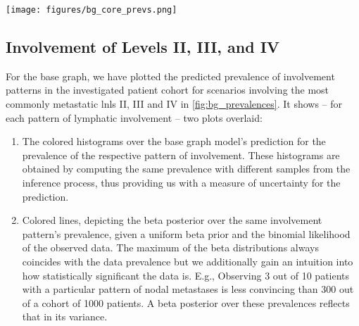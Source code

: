 \documentclass[twocolumn]{aastex631}
\begin{document}
\begin{figure*}
    \begin{centering}
        \texttt{[image: figures/bg\_core\_prevs.png]}
        \caption{Prevalence of involvement as predicted by the base graph model for different scenarios involving the most commonly metastatic \glspl{lnl} II, III and IV (shaded histograms). The model's predictions are compared to Beta posteriors over the prevalence based on the frequency of the same scenarios and a uniform prior (slid lines). The top panel shows some selected scenarios with early T-category tumors and the bottom panel with late T-category.}
        \label{fig:bg_prevalences}
    \end{centering}
\end{figure*}


\subsection{Involvement of Levels II, III, and IV}
\label{subsec:results:lnls_II_III_IV}

For the base graph, we have plotted the predicted prevalence of involvement patterns in the investigated patient cohort for scenarios involving the most commonly metastatic \glspl{lnl} II, III and IV in \cref{fig:bg_prevalences}. It shows -- for each pattern of lymphatic involvement -- two plots overlaid:

\begin{enumerate}
    \item The colored histograms over the base graph model's prediction for the prevalence of the respective pattern of involvement. These histograms are obtained by computing the same prevalence with different samples from the inference process, thus providing us with a measure of uncertainty for the prediction.
    \item Colored lines, depicting the beta posterior over the same involvement pattern's prevalence, given a uniform beta prior and the binomial likelihood of the observed data. The maximum of the beta distributions always coincides with the data prevalence but we additionally gain an intuition into how statistically significant the data is. E.g., Observing 3 out of 10 patients with a particular pattern of nodal metastases is less convincing than 300 out of a cohort of 1000 patients. A beta posterior over these prevalences reflects that in its variance.
\end{enumerate}
\end{document}
